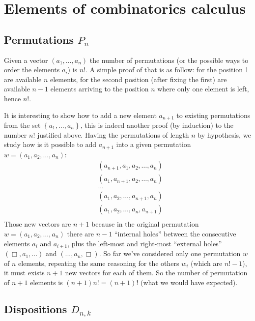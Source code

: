 
\section{Elements of combinatorics calculus}

\subsection{Permutations $P_n$}

Given a vector $\left ( a_1, \ldots, a_n \right) $ the number of
permutations (or the possible ways to order the elements $a_i$) is
$n!$. A simple proof of that is as follow: for the position 1 are
available $n$ elements, for the second position (after fixing the
first) are available $n-1$ elements arriving to the position $n$ where
only one element is left, hence $n!$.

It is interesting to show how to add a new element $a_{n+1}$ to
existing permutations from the set $\left \lbrace a_1, \ldots,
  a_n\right\rbrace $, this is indeed another proof (by induction) to
the number $n!$ justified above. Having the permutations of length $n$
by hypothesis, we study how is it possible to add $a_{n+1}$ into a
given permutation $w = \left ( a_1, a_2, \ldots, a_n\right) $:
\begin{displaymath}
  \begin{split}
    &\left ( a_{n+1}, a_1, a_2, \ldots, a_n\right)\\
    &\left ( a_1, a_{n+1}, a_2, \ldots, a_n\right)\\
    &\ldots\\
    &\left ( a_1, a_2, \ldots, a_{n+1}, a_n\right)\\
    &\left ( a_1, a_2, \ldots, a_n, a_{n+1}\right)\\    
  \end{split}
\end{displaymath}
Those new vectors are $n+1$ because in the original permutation $w =
\left ( a_1, a_2, \ldots, a_n\right) $ there are $n-1$ ``internal
holes'' between the consecutive elements $a_i$ and $a_{i+1}$, plus the
left-most and right-most ``external holes'' $(\Box, a_1,...)$ and
$(..., a_n, \Box)$. So far we've considered only one permutation $w$
of $n$ elements, repeating the same reasoning for the others $w_i$
(which are $n!-1$), it must exists $n+1$ new vectors for each of
them. So the number of permutation of $n+1$ elements is $(n+1)n! =
(n+1)!$ (what we would have expected).

\subsection{Dispositions $D_{n,k}$}

